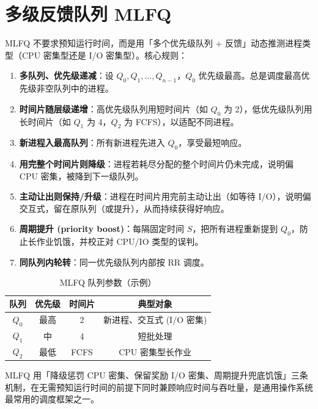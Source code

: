 \section{多级反馈队列 MLFQ}

MLFQ 不要求预知运行时间，而是用「多个优先级队列 + 反馈」动态推测进程类型（CPU 密集型还是 I/O 密集型）。核心规则：

\begin{enumerate}
    \item \textbf{多队列、优先级递减}：设 $Q_0,Q_1,\dots,Q_{n-1}$，$Q_0$ 优先级最高。总是调度最高优先级非空队列中的进程。
    \item \textbf{时间片随层级递增}：高优先级队列用短时间片（如 $Q_0$ 为 2），低优先级队列用长时间片（如 $Q_1$ 为 4，$Q_2$ 为 FCFS），以适配不同进程。
    \item \textbf{新进程入最高队列}：所有新进程先进入 $Q_0$，享受最短响应。
    \item \textbf{用完整个时间片则降级}：进程若耗尽分配的整个时间片仍未完成，说明偏 CPU 密集，被降到下一级队列。
    \item \textbf{主动让出则保持/升级}：进程在时间片用完前主动让出（如等待 I/O），说明偏交互式，留在原队列（或提升），从而持续获得好响应。
    \item \textbf{周期提升 (priority boost)}：每隔固定时间 $S$，把所有进程重新提到 $Q_0$，防止长作业饥饿，并校正对 CPU/IO 类型的误判。
    \item \textbf{同队列内轮转}：同一优先级队列内部按 RR 调度。
\end{enumerate}

\begin{table}[H]
\centering
\caption{MLFQ 队列参数（示例）}
\begin{tabulary}{\textwidth}{CCCC}
\toprule
队列 & 优先级 & 时间片 & 典型对象 \\
\midrule
$Q_0$ & 最高 & 2 & 新进程、交互式 (I/O 密集) \\
$Q_1$ & 中 & 4 & 短批处理 \\
$Q_2$ & 最低 & FCFS & CPU 密集型长作业 \\
\bottomrule
\end{tabulary}
\end{table}

\noindent MLFQ 用「降级惩罚 CPU 密集、保留奖励 I/O 密集、周期提升兜底饥饿」三条机制，在无需预知运行时间的前提下同时兼顾响应时间与吞吐量，是通用操作系统最常用的调度框架之一。

